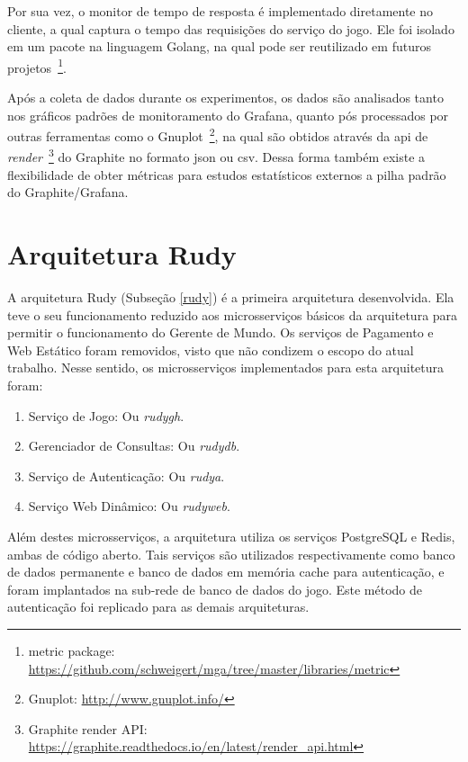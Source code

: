 Por sua vez, o monitor de tempo de resposta é implementado diretamente no cliente, a qual captura o tempo das requisições do serviço do jogo.
%
Ele foi isolado em um pacote na linguagem Golang, na qual pode ser reutilizado em futuros projetos~\footnote{metric package: \url{https://github.com/schweigert/mga/tree/master/libraries/metric}}.

Após a coleta de dados durante os experimentos, os dados são analisados tanto nos gráficos padrões de monitoramento do Grafana, quanto pós processados por outras ferramentas como o Gnuplot~\footnote{Gnuplot: \url{http://www.gnuplot.info/}}, na qual são obtidos através da \ac{api} de \textit{render}~\footnote{Graphite render API: \url{https://graphite.readthedocs.io/en/latest/render_api.html}} do Graphite no formato \ac{json} ou \ac{csv}.
%
Dessa forma também existe a flexibilidade de obter métricas para estudos estatísticos externos a pilha padrão do Graphite/Grafana.



\section{Arquitetura Rudy}
\label{sec:arc_rudy}

A arquitetura Rudy (Subseção \ref{rudy}) é a primeira arquitetura desenvolvida.
%
Ela teve o seu funcionamento reduzido aos microsserviços básicos da arquitetura para permitir o funcionamento do Gerente de Mundo.
%
Os serviços de Pagamento e Web Estático foram removidos, visto que não condizem o escopo do atual trabalho.
%
Nesse sentido, os microsserviços implementados para esta arquitetura foram:

\begin{enumerate}
    \item Serviço de Jogo: Ou \textit{rudygh}.
    \item Gerenciador de Consultas: Ou \textit{rudydb}.
    \item Serviço de Autenticação: Ou \textit{rudya}.
    \item Serviço Web Dinâmico: Ou \textit{rudyweb}.
\end{enumerate}

Além destes microsserviços, a arquitetura utiliza os serviços PostgreSQL e Redis, ambas de código aberto.
%
Tais serviços são utilizados respectivamente como banco de dados permanente e banco de dados em memória cache para autenticação, e foram implantados na sub-rede de banco de dados do jogo.
%
Este método de autenticação foi replicado para as demais arquiteturas.

